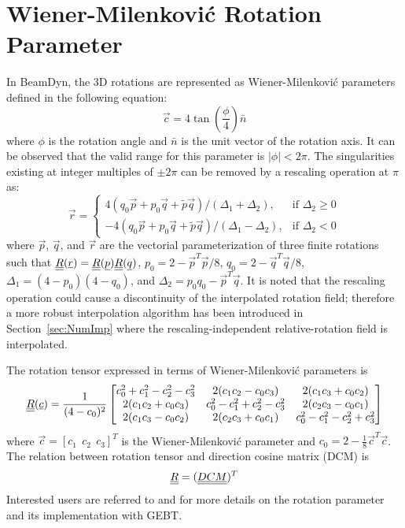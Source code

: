 \section{Wiener-Milenkovi\'c Rotation Parameter}
In BeamDyn, the 3D rotations are represented as Wiener-Milenkovi\'c parameters defined in the following equation:
 \begin{equation}
     \vec{c} = 4 \tan\left(\frac{\phi}{4} \right) \bar{n} 
     \label{WMParameter}
 \end{equation}
where $\phi$ is the rotation angle and $\bar{n}$ is the unit vector of the
rotation axis. It can be observed that the valid range for this parameter is
$|\phi| < 2 \pi$. The singularities existing at integer multiples of $\pm 2 \pi$ can be removed by a rescaling operation at $\pi$ as:
\begin{equation}
    \label{RescaledWM}
    \vec{r} = \begin{cases}
    4(q_0\vec{p} + p_0 \vec{q} + \tilde{p} \vec{q} ) / (\Delta_1 + \Delta_2), & \text{if } \Delta_2 \geq 0 \\
    -4(q_0\vec{p} + p_0 \vec{q} + \tilde{p} \vec{q} ) / (\Delta_1 - \Delta_2), & \text{if } \Delta_2 < 0
    \end{cases}
\end{equation}
where $\vec{p}$, $\vec{q}$, and $\vec{r}$ are the vectorial parameterization of three finite rotations such that $\underline{\underline{R}}(\underline{r}) = \underline{\underline{R}}(\underline{p}) \underline{\underline{R}}(\underline{q})$, $p_0 = 2 - \vec{p}^T \vec{p}/8$, $q_0 = 2 - \vec{q}^T \vec{q}/8$, $\Delta_1 = (4-p_0)(4-q_0)$, and $\Delta_2 = p_0 q_0 - \vec{p}^T \vec{q}$.
It is noted that the rescaling operation could cause a discontinuity of the
interpolated rotation field; therefore a more robust interpolation algorithm
has been introduced in Section~\ref{sec:NumImp} where the rescaling-independent
relative-rotation field is interpolated. 

The rotation tensor expressed in terms of Wiener-Milenkovi\'c parameters is
\begin{equation}
   \label{eqn:RotTensorWM}
   \underline{\underline{R}} (\underline{c}) = \frac{1}{(4-c_0)^2}
   \begin{bmatrix}
    c_0^2 + c_1^2 - c_2^2 - c_3^2 & 2(c_1 c_2 - c_0 c_3) & 2(c_1 c_3 + c_0 c_2) \\
    2(c_1 c_2 + c_0 c_3) & c_0^2 - c_1^2 + c_2^2 - c_3^2 & 2(c_2 c_3 - c_0 c_1) \\
    2(c_1 c_3 - c_0 c_2)  & 2(c_2 c_3 + c_0 c_1) & c_0^2 - c_1^2 - c_2^2 + c_3^2 \\
    \end{bmatrix}
\end{equation}
where $\vec{c} = \left[ c_1~~c_2~~c_3\right]^T$ is the Wiener-Milenkovi\'c parameter and $c_0 = 2 - \frac{1}{8}\vec{c}^T \vec{c}$. The relation between rotation tensor and direction cosine matrix (DCM) is
\begin{equation}
    \label{RT2DCM}
    \underline{\underline{R}} = (\underline{\underline{DCM}})^T
\end{equation}
Interested users are referred to \cite{Bauchau-etal:2008} and \cite{Wang:GEBT2013} for more details on the rotation parameter and its implementation with GEBT.

